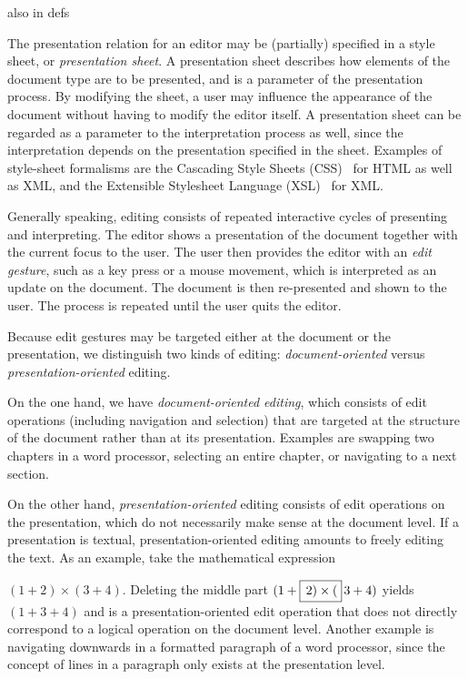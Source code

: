 \documentclass{speauth}
\begin{document}
also in defs

\ec

The presentation relation for an editor may be (partially) specified in a style sheet, or {\em presentation sheet}. A presentation sheet describes how elements of the document type are to be presented, and is a parameter of the presentation process. By modifying the sheet, a user may influence the appearance of the document without having to modify the editor itself. A presentation sheet can be regarded as a parameter to the interpretation process as well, since the interpretation depends on the presentation specified in the sheet. Examples of style-sheet formalisms are the Cascading Style Sheets (CSS)~\cite{css2} for HTML as well as XML, and the Extensible Stylesheet Language (XSL)~\cite{xsl10} for XML.

Generally speaking, editing consists of repeated interactive cycles of presenting and interpreting. The editor shows a presentation of the document together with the current focus to the user. The user then provides the editor with an {\em edit gesture}, such as a key press or a mouse movement, which is interpreted as an update on the document. The document is then re-presented and shown to the user. The process is repeated until the user quits the editor.



Because edit gestures may be targeted either at the document or the presentation, we distinguish two kinds of editing:  {\em document-oriented} versus {\em presentation-oriented} editing.

On the one hand, we have {\em document-oriented editing}, which consists of edit operations (including navigation and selection) that are targeted at the structure of the document rather than at its presentation. Examples are swapping two chapters in a word processor, selecting an entire chapter, or navigating to a next section.

On the other hand, {\em presentation-oriented} editing consists of edit operations on the presentation, which do not necessarily make sense at the document level. If a presentation is textual,  presentation-oriented editing amounts to freely editing the text. As an example, take the mathematical expression  

$(1+2) \times (3+4)$. Deleting the middle part $(1+\framebox{$\,2) \times ($}\,3+4)$ yields $(1+3+4)$ and is a presentation-oriented edit operation that does not directly correspond to a logical operation on the document level. Another example is navigating downwards in a formatted paragraph of a word processor, since the concept of lines in a paragraph only exists at the presentation level. 
\end{document}
